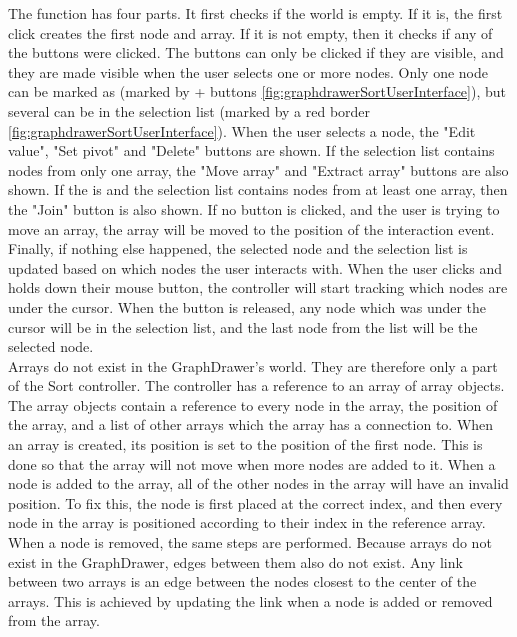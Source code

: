 The  function has four parts. It first checks if the world is empty. If it is, the first click creates the first node and array. If it is not empty, then it checks if any of the buttons were clicked. The buttons can only be clicked if they are visible, and they are made visible when the user selects one or more nodes. Only one node can be marked as  (marked by + buttons \ref{fig:graphdrawerSortUserInterface}), but several can be in the selection list (marked by a red border \ref{fig:graphdrawerSortUserInterface}). When the user selects a node, the "Edit value", "Set pivot" and "Delete" buttons are shown. If the selection list contains nodes from only one array, the "Move array" and "Extract array" buttons are also shown. If the  is  and the selection list contains nodes from at least one array, then the "Join" button is also shown. If no button is clicked, and the user is trying to move an array, the array will be moved to the position of the interaction event. Finally, if nothing else happened, the selected node and the selection list is updated based on which nodes the user interacts with. When the user clicks and holds down their mouse button, the controller will start tracking which nodes are under the cursor. When the button is released, any node which was under the cursor will be in the selection list, and the last node from the list will be the selected node.
\\[11pt]
Arrays do not exist in the GraphDrawer's world. They are therefore only a part of the Sort controller. The controller has a reference to an array of array objects. The array objects contain a reference to every node in the array, the position of the array, and a list of other arrays which the array has a connection to. When an array is created, its position is set to the position of the first node. This is done so that the array will not move when more nodes are added to it. When a node is added to the array, all of the other nodes in the array will have an invalid position. To fix this, the node is first placed at the correct index, and then every node in the array is positioned according to their index in the reference array. When a node is removed, the same steps are performed. Because arrays do not exist in the GraphDrawer, edges between them also do not exist. Any link between two arrays is an edge between the nodes closest to the center of the arrays. This is achieved by updating the link when a node is added or removed from the array.
\\[11pt]
